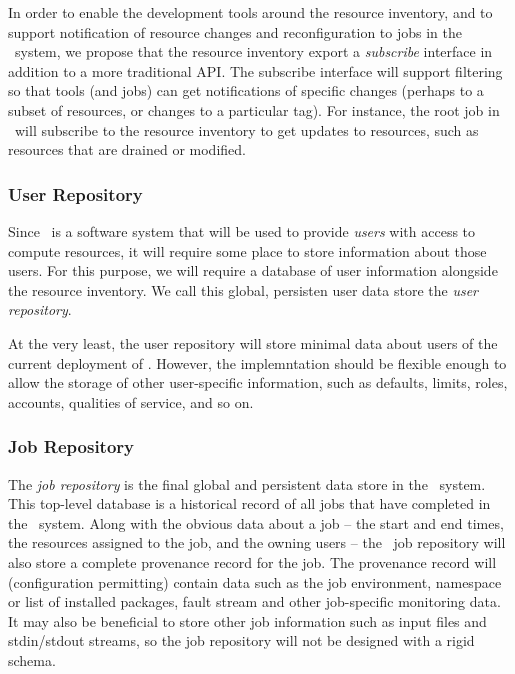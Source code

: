 In order to enable the development tools around the resource
inventory, and to support notification of resource changes and
reconfiguration to jobs in the \ngrm\ system, we propose that
the resource inventory export a \emph{subscribe} interface in
addition to a more traditional API. The subscribe interface will
support filtering so that tools (and jobs) can get notifications
of specific changes (perhaps to a subset of resources, or changes
to a particular tag). For instance, the root job in \ngrm\ will
subscribe to the resource inventory to get updates to resources,
such as resources that are drained or modified.

\subsubsection{User Repository}

Since \ngrm\ is a software system that will be used to provide
\emph{users} with access to compute resources, it will require
some place to store information about those users. For this
purpose, we will require a database of user information alongside
the resource inventory. We call this global, persisten user
data store the \emph{user repository}.

At the very least, the user repository will store minimal
data about users of the current deployment of \ngrm. However,
the implemntation should be flexible enough to allow the storage
of other user-specific information, such as defaults, limits,
roles, accounts, qualities of service, and so on.

\subsubsection{Job Repository}

The \emph{job repository} is the final global and persistent
data store in the \ngrm\ system. This top-level database is a
historical record of all jobs that have completed in the
\ngrm\ system. Along with the obvious data about a job --
the start and end times, the resources assigned to the job,
and the owning users -- the \ngrm\ job repository will also
store a complete provenance record for the job. The provenance
record will (configuration permitting) contain data such as the
job environment, namespace or list of installed packages, fault
stream and other job-specific monitoring data. It may also be
beneficial to store other job information such as input files
and stdin/stdout streams, so the job repository will not be
designed with a rigid schema.

